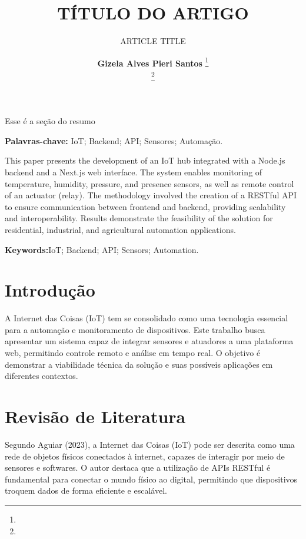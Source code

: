 \documentclass[12pt]{unisenaiclass}
\title{TÍTULO DO ARTIGO}
\subtitle{ARTICLE TITLE}
\author{
    \textbf{Gizela Alves Pieri Santos } \thanks{}\\
    \textbf{} \thanks{}
}
\begin{document}
\maketitle

\begin{resumo}
Esse é a seção do resumo
\end{resumo}

\begin{justify}
    \textbf{Palavras-chave:}  IoT; Backend; API; Sensores; Automação.
\end{justify}

\begin{abstract1}
This paper presents the development of an IoT hub integrated with a Node.js backend and a Next.js web interface. The system enables monitoring of temperature, humidity, pressure, and presence sensors, as well as remote control of an actuator (relay). The methodology involved the creation of a RESTful API to ensure communication between frontend and backend, providing scalability and interoperability. Results demonstrate the feasibility of the solution for residential, industrial, and agricultural automation applications.
\end{abstract1}

\begin{justify}
    \textbf{Keywords:}IoT; Backend; API; Sensors; Automation.  
\end{justify}



\section{Introdução}
A Internet das Coisas (IoT) tem se consolidado como uma tecnologia essencial para a automação e monitoramento de dispositivos. Este trabalho busca apresentar um sistema capaz de integrar sensores e atuadores a uma plataforma web, permitindo controle remoto e análise em tempo real. O objetivo é demonstrar a viabilidade técnica da solução e suas possíveis aplicações em diferentes contextos.
\section{Revisão de Literatura}
Segundo Aguiar (2023), a Internet das Coisas (IoT) pode ser descrita como uma rede de objetos físicos conectados à internet, capazes de interagir por meio de sensores e softwares. O autor destaca que a utilização de APIs RESTful é fundamental para conectar o mundo físico ao digital, permitindo que dispositivos troquem dados de forma eficiente e escalável.
\end{document}
